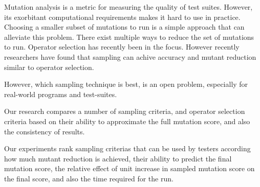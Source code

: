 Mutation analysis is a metric for measuring the quality of test suites. However, its exorbitant computational requirements makes it hard to use in practice. Choosing a smaller subset of mutations to run is a simple approach that can alleviate this problem. There exist multiple ways to reduce the set of mutations to run. Operator selection has recently been in the focus. However recently researchers have found that sampling can achive accuracy and mutant reduction similar to operator selection.

However, which sampling technique is best, is an open problem, especially for real-world programs and test-suites.

Our research compares a number of sampling criteria, and operator selection criteria based on their ability to approximate the full mutation score, and also the consistency of results.

Our experiments rank sampling criterias that can be used by testers according how much mutant reduction is achieved, their ability to predict the final mutation score, the relative effect of unit increase in sampled mutation score on the final score, and also the time required for the run.

